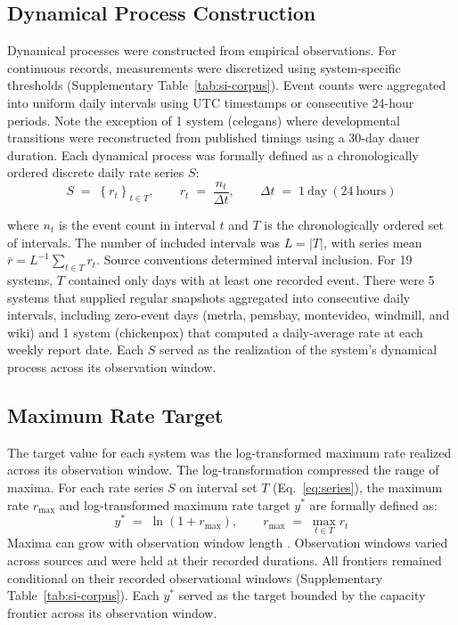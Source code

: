 \documentclass{article}
\begin{document}
\subsection*{Dynamical Process Construction}
Dynamical processes were constructed from empirical observations.
For continuous records, measurements were discretized using system-specific thresholds (Supplementary Table~\ref{tab:si-corpus}). Event counts were aggregated into uniform daily intervals using UTC timestamps or consecutive 24-hour periods. Note the exception of 1 system (celegans) where developmental transitions were reconstructed from published timings using a 30-day dauer duration. Each dynamical process was formally defined as a chronologically ordered discrete daily rate series $S$:
\begin{equation}
    S \;=\; \left\{ r_{t} \right\}_{t \in T},
    \qquad
    r_{t} \;=\; \frac{n_{t}}{\Delta t},
    \qquad
    \Delta t \;=\; 1\ \mathrm{day}\ (24\ \mathrm{hours})
    \label{eq:series}
\end{equation}

where $n_{t}$ is the event count in interval $t$ and $T$ is the chronologically ordered set of intervals. The number of included intervals was $L = \lvert T \rvert$, with series mean $\bar{r} = L^{-1}\sum_{t \in T} r_t$. Source conventions determined interval inclusion. For 19 systems, $T$ contained only days with at least one recorded event. There were 5 systems that supplied regular snapshots aggregated into consecutive daily intervals, including zero-event days (metrla, pemsbay, montevideo, windmill, and wiki) and 1 system (chickenpox) that computed a daily-average rate at each weekly report date. Each $S$ served as the realization of the system's dynamical process across its observation window.

\subsection*{Maximum Rate Target}
The target value for each system was the log-transformed maximum rate realized across its observation window. The log-transformation compressed the range of maxima. For each rate series $S$ on interval set $T$ (Eq.~\eqref{eq:series}), the maximum rate $r_{\max}$ and log-transformed maximum rate target $y^*$ are formally defined as:
\begin{equation}
    y^{*} \;=\; \ln\!\left(1 + r_{\max}\right),
    \qquad
    r_{\max} \;=\; \max_{t \in T} r_t
\label{eq:maximum}
\end{equation}
Maxima can grow with observation window length \citep{ref58,ref59,ref60}. Observation windows varied across sources and were held at their recorded durations. All frontiers remained conditional on their recorded observational windows (Supplementary Table~\ref{tab:si-corpus}). Each $y^*$ served as the target bounded by the capacity frontier across its observation window.
\end{document}

